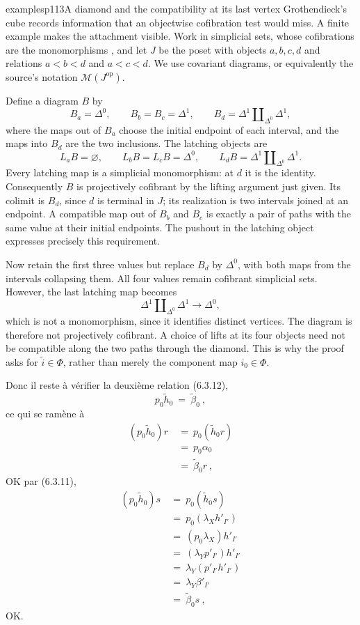 \begin{dcomment}{examples}{p113}{A diamond and the compatibility at its last vertex}
Grothendieck's cube records information that an objectwise cofibration test would miss. A finite example makes the attachment visible. Work in simplicial sets, whose cofibrations are the monomorphisms \citep[Example~11.3.5]{Riehl2014}, and let $J$ be the poset with objects $a,b,c,d$ and relations $a<b<d$ and $a<c<d$. We use covariant diagrams, or equivalently the source's notation $\mathcal M(J^{\mathrm{op}})$.

Define a diagram $B$ by
\[
 B_a=\Delta^0,\qquad
 B_b=B_c=\Delta^1,\qquad
 B_d=\Delta^1\amalg_{\Delta^0}\Delta^1,
\]
where the maps out of $B_a$ choose the initial endpoint of each interval, and the maps into $B_d$ are the two inclusions. The latching objects are
\[
 L_aB=\varnothing,\qquad
 L_bB=L_cB=\Delta^0,\qquad
 L_dB=\Delta^1\amalg_{\Delta^0}\Delta^1.
\]
Every latching map is a simplicial monomorphism: at $d$ it is the identity. Consequently $B$ is projectively cofibrant by the lifting argument just given. Its colimit is $B_d$, since $d$ is terminal in $J$; its realization is two intervals joined at an endpoint. A compatible map out of $B_b$ and $B_c$ is exactly a pair of paths with the same value at their initial endpoints. The pushout in the latching object expresses precisely this requirement.

Now retain the first three values but replace $B_d$ by $\Delta^0$, with both maps from the intervals collapsing them. All four values remain cofibrant simplicial sets. However, the last latching map becomes
\[
 \Delta^1\amalg_{\Delta^0}\Delta^1\longrightarrow\Delta^0,
\]
which is not a monomorphism, since it identifies distinct vertices. The diagram is therefore not projectively cofibrant. A choice of lifts at its four objects need not be compatible along the two paths through the diamond. This is why the proof asks for $\widetilde i\in\Phi$, rather than merely the component map $i_0\in\Phi$.
\end{dcomment}


Donc il reste à vérifier la deuxième relation (6.3.12),
\[
p_0\tilde{h}_0 \ =\ \tilde{\beta}_0\ ,
\]
ce qui se ramène à
\[
\begin{aligned}
(p_0\tilde{h}_0)r \ &=\ p_0(\tilde{h}_0r) \\
&=\ p_0\alpha_0 \\
&=\ \tilde{\beta}_0r\ ,
\end{aligned}
\]
OK par (6.3.11),
\[
\begin{aligned}
(p_0\tilde{h}_0)s \ &=\ p_0(\tilde{h}_0s) \\
&=\ p_0(\lambda_X h'_{I'}) \\
&=\ (p_0\lambda_X)h'_{I'} \\
&=\ (\lambda_Y p'_{I'})h'_{I'} \\
&=\ \lambda_Y(p'_{I'}h'_{I'}) \\
&=\ \lambda_Y\beta'_{I'} \\
&=\ \tilde{\beta}_0s\ ,
\end{aligned}
\]
OK.


